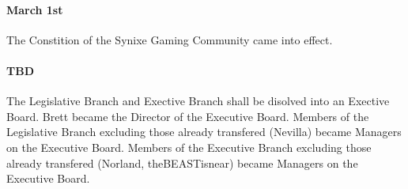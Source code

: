 \documentclass[10pt,a4paper]{article}
\begin{document}
\paragraph{March 1st}
The Constition of the Synixe Gaming Community came into effect.
\paragraph{TBD}
The Legislative Branch and Exective Branch shall be disolved into an Exective Board. Brett became the Director of the Executive Board. Members of the Legislative Branch excluding those already transfered (Nevilla) became Managers on the Executive Board. Members of the Executive Branch excluding those already transfered (Norland, theBEASTisnear) became Managers on the Executive Board.
\end{document}
